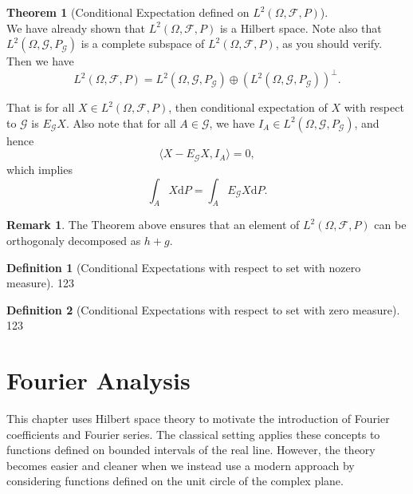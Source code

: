 \documentclass[12pt]{book}
\theoremstyle{definition}
\newtheorem{definition}{Definition}[chapter]
\newtheorem{theorem}{Theorem}[chapter]
\newtheorem{remark}{Remark}
\newcommand{\inner}[2]{{\langle #1,#2\rangle}}
\newcommand{\D}{\mathrm{d}}
\begin{document}
\begin{theorem}[Conditional Expectation defined on $L^2(\Omega,\mathcal{F},P)$] \ \\
We have already shown that $L^2(\Omega,\mathcal{F},P)$ is a Hilbert space. Note also that $L^2(\Omega,\mathcal{G},P_{\mathcal{G}})$ is a complete  subspace of $L^2(\Omega,\mathcal{F},P)$, as you should verify. Then we have 
$$
L^2(\Omega,\mathcal{F},P) = L^2(\Omega,\mathcal{G},P_{\mathcal{G}}) \oplus (L^2(\Omega,\mathcal{G},P_{\mathcal{G}}))^{\perp}.
$$
\end{theorem}
That is for all $X \in L^2(\Omega,\mathcal{F},P)$, then conditional expectation of $X$ with respect to $\mathcal G$ is $E_\mathcal G X$. Also note that for all $A \in \mathcal G$, we have $I_A \in L^2(\Omega,\mathcal{G},P_{\mathcal{G}})$, and hence 
$$
\inner{X-E_\mathcal G X}{I_A}=0,
$$
which implies 
$$
\int_A X \D P = \int_A E_\mathcal G X \D P.
$$




\begin{remark}
The Theorem above ensures that an element of $L^2(\Omega,\mathcal{F},P)$ can be orthogonaly decomposed as $h+g$.
\end{remark}

\begin{definition}[Conditional Expectations with respect to set with nozero measure] 
	123
\end{definition}
\begin{definition}[Conditional Expectations with respect to set with zero measure]
	123
\end{definition}
























\chapter{Fourier Analysis}
This chapter uses Hilbert space theory to motivate the introduction of Fourier coefficients and Fourier series. The classical setting applies these concepts to functions defined on bounded intervals of the real line. However, the theory becomes easier and cleaner when we instead use a modern approach by considering functions defined on the unit circle of the complex plane.
\end{document}
